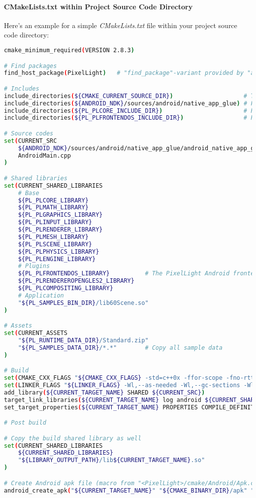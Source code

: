 \paragraph{CMakeLists.txt within Project Source Code Directory}
Here's an example for a simple \emph{CMakeLists.txt} file within your project source code directory:
\begin{lstlisting}[language=sh]
cmake_minimum_required(VERSION 2.8.3)

# Find packages
find_host_package(PixelLight)	# "find_package"-variant provided by "android.toolchain.cmake", required for PixelLight CMake variables like "PL_PLCORE_INCLUDE_DIR"

# Includes
include_directories(${CMAKE_CURRENT_SOURCE_DIR})					# The current source directory
include_directories(${ANDROID_NDK}/sources/android/native_app_glue)	# For the "android_native_app_glue.h"-header include
include_directories(${PL_PLCORE_INCLUDE_DIR})						# PLCore headers
include_directories(${PL_PLFRONTENDOS_INCLUDE_DIR})					# PLFrontendOS headers

# Source codes
set(CURRENT_SRC
	${ANDROID_NDK}/sources/android/native_app_glue/android_native_app_glue.c
	AndroidMain.cpp
)

# Shared libraries
set(CURRENT_SHARED_LIBRARIES
	# Base
	${PL_PLCORE_LIBRARY}
	${PL_PLMATH_LIBRARY}
	${PL_PLGRAPHICS_LIBRARY}
	${PL_PLINPUT_LIBRARY}
	${PL_PLRENDERER_LIBRARY}
	${PL_PLMESH_LIBRARY}
	${PL_PLSCENE_LIBRARY}
	${PL_PLPHYSICS_LIBRARY}
	${PL_PLENGINE_LIBRARY}
	# Plugins
	${PL_PLFRONTENDOS_LIBRARY}			# The PixelLight Android frontend
	${PL_PLRENDEREROPENGLES2_LIBRARY}
	${PL_PLCOMPOSITING_LIBRARY}
	# Application
	"${PL_SAMPLES_BIN_DIR}/lib60Scene.so"
)

# Assets
set(CURRENT_ASSETS
	"${PL_RUNTIME_DATA_DIR}/Standard.zip"
	"${PL_SAMPLES_DATA_DIR}/*.*"		# Copy all sample data
)

# Build
set(CMAKE_CXX_FLAGS "${CMAKE_CXX_FLAGS} -std=c++0x -ffor-scope -fno-rtti -fno-exceptions -pipe -ffunction-sections -fdata-sections -ffast-math -Wnon-virtual-dtor -Wreorder -Wsign-promo -fvisibility=hidden -fvisibility-inlines-hidden -Wstrict-null-sentinel -Os -funroll-all-loops -fpeel-loops -ftree-vectorize")
set(LINKER_FLAGS "${LINKER_FLAGS} -Wl,--as-needed -Wl,--gc-sections -Wl,--no-undefined -Wl,--strip-all -Wl,-rpath-link=${ANDROID_NDK_SYSROOT}/usr/lib/ -L${ANDROID_NDK_SYSROOT}/usr/lib/")
add_library(${CURRENT_TARGET_NAME} SHARED ${CURRENT_SRC})
target_link_libraries(${CURRENT_TARGET_NAME} log android ${CURRENT_SHARED_LIBRARIES})
set_target_properties(${CURRENT_TARGET_NAME} PROPERTIES COMPILE_DEFINITIONS "__STDC_INT64__;LINUX;ANDROID")	# PLCore needs the preprocessor definitions "LINUX" and "ANDROID"

# Post build

# Copy the build shared library as well
set(CURRENT_SHARED_LIBRARIES
	${CURRENT_SHARED_LIBRARIES}
	"${LIBRARY_OUTPUT_PATH}/lib${CURRENT_TARGET_NAME}.so"
)

# Create Android apk file (macro from "<PixelLight>/cmake/Android/Apk.cmake")
android_create_apk("${CURRENT_TARGET_NAME}" "${CMAKE_BINARY_DIR}/apk" "${CURRENT_SHARED_LIBRARIES}" "${CURRENT_ASSETS}" "Data")
\end{lstlisting}


